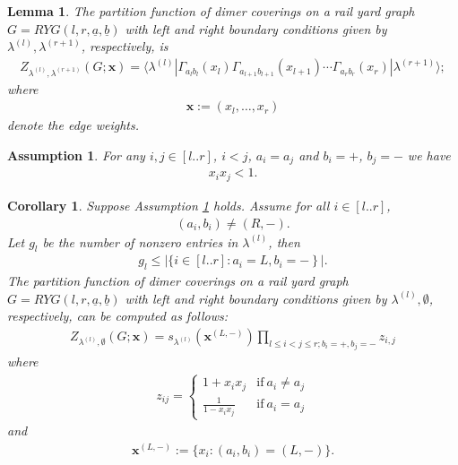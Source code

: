 \documentclass[10pt,a4paper]{amsart}
\newtheorem{lemma}{Lemma}
\newtheorem{assumption}{Assumption}
\newtheorem{corollary}{Corollary}
\begin{document}
\begin{lemma}\label{l13}The partition function of dimer coverings on a rail yard graph $G=RYG(l,r,\underline{a},\underline{b})$ with left and right boundary conditions given by $\lambda^{(l)},\lambda^{(r+1)}$, respectively,  is 
\begin{eqnarray}
Z_{\lambda^{(l)},\lambda^{(r+1)}}(G;\mathbf{x})=\langle\lambda^{(l)}| \Gamma_{a_lb_l}(x_l)\Gamma_{a_{l+1}b_{l+1}}(x_{l+1})\cdots \Gamma_{a_rb_r}(x_r)|\lambda^{(r+1)} \rangle;\label{bf}
\end{eqnarray}
where
\begin{align}
\mathbf{x}:=(x_{l},\ldots,x_{r})
\end{align}
denote the edge weights.
\end{lemma}

\begin{assumption}\label{ap14}For any $i,j\in[l..r]$, $i<j$, $a_i=a_j$ and $b_i=+$, $b_j=-$ we have
\begin{eqnarray*}
x_ix_j<1.
\end{eqnarray*}
\end{assumption}

\begin{corollary}\label{lc13}Suppose Assumption \ref{ap14} holds.
Assume for all
$i\in[l..r]$,
\begin{eqnarray}
(a_i,b_i)\neq (R,-).\label{c151}
\end{eqnarray}
Let $g_l$ be the number of nonzero entries in $\lambda^{(l)}$, then
\begin{eqnarray}
g_l\leq \left|\{i\in[l..r]:a_i=L,b_i=-\right\}|.\label{glu}
\end{eqnarray}
The partition function of dimer coverings on a rail yard graph $G=RYG(l,r,\underline{a},\underline{b})$ with left and right boundary conditions given by $\lambda^{(l)},\emptyset$, respectively,  can be computed as follows:
\begin{eqnarray}
Z_{\lambda^{(l)},\emptyset}(G;\mathbf{x})=s_{\lambda^{(l)}}\left(\mathbf{x}^{(L,-)}\right)\prod_{l\leq i<j\leq r;b_i=+,b_j=-}z_{i,j}\label{fp}
\end{eqnarray}
where
\begin{eqnarray}
z_{ij}=\begin{cases}1+x_ix_j&\mathrm{if}\ a_i\neq a_j\\\frac{1}{1-x_ix_j}&\mathrm{if}\ a_i=a_j\end{cases}\label{dzij}
\end{eqnarray}
and
\begin{eqnarray*}
\mathbf{x}^{(L,-)}:=\{x_i: (a_i,b_i)=(L,-)\}.
\end{eqnarray*}
\end{corollary}
\end{document}
